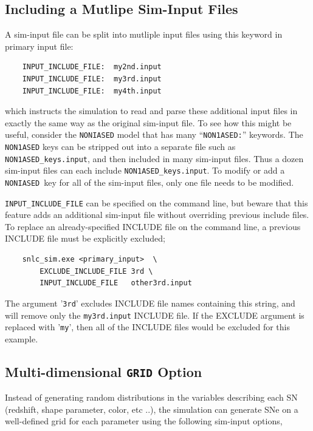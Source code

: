 \documentclass[12pt]{article}
\newcommand{\NONIA}{{\tt NONIASED}}
\begin{document}
   \subsection{Including a Mutlipe Sim-Input Files}
   \label{subsec:split_siminput}

A sim-input file can be split into mutliple input files
using this keyword in primary input file:
\begin{verbatim}
    INPUT_INCLUDE_FILE:  my2nd.input
    INPUT_INCLUDE_FILE:  my3rd.input
    INPUT_INCLUDE_FILE:  my4th.input
\end{verbatim}
%
which instructs the simulation to read and parse these additional input files
in exactly the same way as the original sim-input file. To see how this might
be useful, consider the {\NONIA} model that has many ``{\tt NON1ASED:}'' keywords. 
The {\tt NON1ASED} keys can be stripped out into a separate 
file such as {\tt NON1ASED\_keys.input}, and then included
in many sim-input files. 
Thus a dozen sim-input files can each include {\tt NON1ASED\_keys.input}.
To modify or add a \NONIA\ key for all of the 
sim-input files, only one file needs to be modified.

{\tt INPUT\_INCLUDE\_FILE} can be specified on the command line, but beware
that this feature adds an additional sim-input file without overriding previous
include files. To replace an already-specified INCLUDE file on the command line,
a previous INCLUDE file must be explicitly excluded;
\begin{verbatim} 
    snlc_sim.exe <primary_input>  \
        EXCLUDE_INCLUDE_FILE 3rd \
        INPUT_INCLUDE_FILE   other3rd.input
\end{verbatim}
The argument '{\tt 3rd}' excludes INCLUDE file names containing this string, and will
remove only the {\tt my3rd.input} INCLUDE file. If the EXCLUDE argument is replaced
with '{\tt my}', then all of the INCLUDE files would be excluded for this example.

   \clearpage
   \subsection{Multi-dimensional {\tt GRID} Option}
   \label{ssec:grid}

\newcommand{\SNPARINFO}{SNPAR-INFO}
\newcommand{\ILC}{ILC}
\newcommand{\MAGPACK}{1000}


Instead of generating random distributions in the
variables describing each SN 
(redshift, shape parameter, color, etc ..),
the simulation can generate SNe on a well-defined
grid for each parameter using the following sim-input
options,
\end{document}
